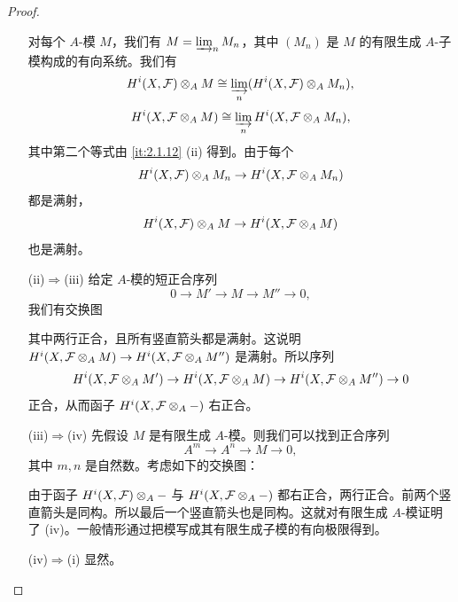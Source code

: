 \begin{proof}
\begin{enumerate}[label=(\roman*)]
对每个 $A$-模 $M$，我们有 $M=\dlim_nM_n$，其中 $(M_n)$ 是 $M$ 的有限生成 $A$-子模构成的有向系统。我们有
\[
H^i(X,\cF)\tensor_A M\cong\dlim_n(H^i(X,\cF)\tensor_A M_n),
\]
\[
H^i(X,\cF\tensor_A M)\cong\dlim_nH^i(X,\cF\tensor_A M_n),
\]
其中第二个等式由 \ref{it:2.1.12} (ii) 得到。由于每个
\[
H^i(X,\cF)\tensor_A M_n\to H^i(X,\cF\tensor_A M_n)
\]
都是满射，
\[
H^i(X,\cF)\tensor_A M\to H^i(X,\cF\tensor_A M)
\]
也是满射。

\item[(ii)$\Rightarrow$(iii)] 给定 $A$-模的短正合序列
\[
0\to M'\to M\to M''\to 0,
\]
我们有交换图

\begin{center}
\end{center}

其中两行正合，且所有竖直箭头都是满射。这说明 $H^i(X,\mathcal{F}\otimes_A M)\to H^i(X,\mathcal{F}\otimes_A M'')$ 是满射。所以序列
\[
H^i(X,\mathcal{F}\otimes_A M')\to H^i(X,\mathcal{F}\otimes_A M)\to H^i(X,\mathcal{F}\otimes_A M'')\to 0
\]
正合，从而函子 $H^i(X,\mathcal{F}\otimes_A-)$ 右正合。

\item[(iii)$\Rightarrow$(iv)] 先假设 $M$ 是有限生成 $A$-模。则我们可以找到正合序列
\[
A^m\to A^n\to M\to 0,
\]
其中 $m,n$ 是自然数。考虑如下的交换图：

\begin{center}
\end{center}

由于函子 $H^i(X,\mathcal{F})\otimes_A-$ 与 $H^i(X,\mathcal{F}\otimes_A-)$ 都右正合，两行正合。前两个竖直箭头是同构。所以最后一个竖直箭头也是同构。这就对有限生成 $A$-模证明了 (iv)。一般情形通过把模写成其有限生成子模的有向极限得到。

\item[(iv)$\Rightarrow$(i)] 显然。
\end{enumerate}
\end{proof}

